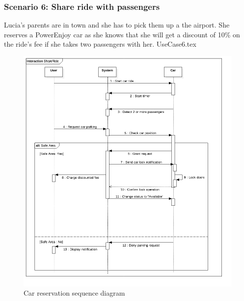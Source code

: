 \documentclass[12pt]{article}
\begin{document}
		\subsubsection{Scenario 6: Share ride with passengers}
		Lucia's parents are in town and she has to pick them up a the airport. She reserves
		a PowerEnjoy car as she knows that she will get a discount of 10\% on the ride's fee
		if she takes two passengers with her.
		\FloatBarrier
		{UseCase6.tex}
		\newpage
		\begin{figure}[htbp]
		 \caption{Car reservation sequence diagram}
		\includegraphics[scale=0.49]{Images/SequenceDiagram/ShareRide.png}
 	 	\end{figure}
 	 	\clearpage
		
\end{document}
